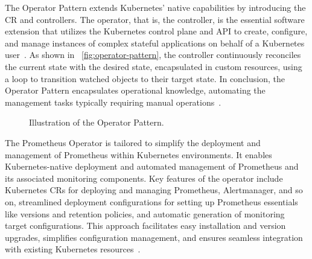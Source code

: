 The Operator Pattern extends Kubernetes' native capabilities by introducing the \ac{CR} and controllers. The operator, that is, the controller, is the essential software extension that utilizes the Kubernetes control plane and \ac{API} to create, configure, and manage instances of complex stateful applications on behalf of a Kubernetes user~\parencite{dobiesKubernetesOperators}. As shown in ~\autoref{fig:operator-pattern}, the controller continuously reconciles the current state with the desired state, encapsulated in custom resources, using a loop to transition watched objects to their target state. In conclusion, the Operator Pattern encapsulates operational knowledge, automating the management tasks typically requiring manual operations~\parencite{cncfCNCFOperatorWhite}. 

\begin{figure}[htpb]
    \centering
    \caption[Illustration of the Operator Pattern]{Illustration of the Operator Pattern.}\label{fig:operator-pattern}
\end{figure}

The Prometheus Operator is tailored to simplify the deployment and management of Prometheus within Kubernetes environments. It enables Kubernetes-native deployment and automated management of Prometheus and its associated monitoring components. Key features of the operator include Kubernetes \ac{CR}s for deploying and managing Prometheus, Alertmanager, and so on, streamlined deployment configurations for setting up Prometheus essentials like versions and retention policies, and automatic generation of monitoring target configurations. This approach facilitates easy installation and version upgrades, simplifies configuration management, and ensures seamless integration with existing Kubernetes resources~\parencite{prometheusoperatorIntroduction2020}. 


